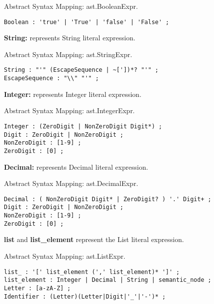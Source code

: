 \begin{description}
Abstract Syntax Mapping: ast.BooleanExpr.

\begin{snippet}
\begin{verbatim}
Boolean : 'true' | 'True' | 'false' | 'False' ;
\end{verbatim}
\end{snippet}

\item\textbf{String:} represents String literal expression.

Abstract Syntax Mapping: ast.StringExpr.

\begin{snippet}
\begin{verbatim}
String : "'" (EscapeSequence | ~['])*? "'" ;
EscapeSequence : "\\" "'" ;
\end{verbatim}
\end{snippet}

\item\textbf{Integer:} represents Integer literal expression. 

Abstract Syntax Mapping: ast.IntegerExpr.

\begin{snippet}
\begin{verbatim}
Integer : (ZeroDigit | NonZeroDigit Digit*) ;
Digit : ZeroDigit | NonZeroDigit ;
NonZeroDigit : [1-9] ;
ZeroDigit : [0] ;
\end{verbatim}
\end{snippet}

\item\textbf{Decimal:} represents Decimal literal expression. 

Abstract Syntax Mapping: ast.DecimalExpr.

\begin{snippet}
\begin{verbatim}
Decimal : ( NonZeroDigit Digit* | ZeroDigit? ) '.' Digit+ ;
Digit : ZeroDigit | NonZeroDigit ;
NonZeroDigit : [1-9] ;
ZeroDigit : [0] ;
\end{verbatim}
\end{snippet}

\item\textbf{list} and \textbf{list\_element} represent the List literal expression. 

Abstract Syntax Mapping: ast.ListExpr.

\begin{snippet}
\begin{verbatim}
list_ : '[' list_element (',' list_element)* ']' ;
list_element : Integer | Decimal | String | semantic_node ;
Letter : [a-zA-Z] ;
Identifier : (Letter)(Letter|Digit|'_'|'-')* ;
\end{verbatim}
\end{snippet}


\end{description}
